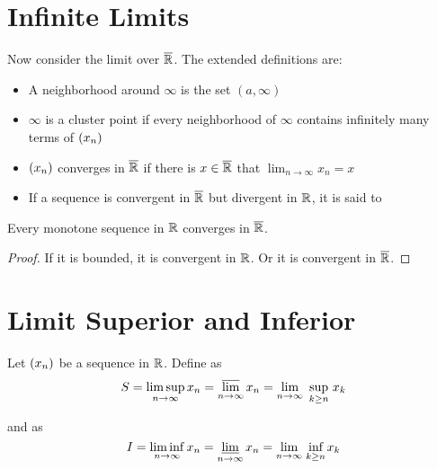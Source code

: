 
\section{Infinite Limits}

Now consider the limit over $\overline{\mathbb{R}}$. The extended definitions are:
\begin{itemize}
    \item A neighborhood around $\infty$ is the set $(a, \infty)$
    \item $\infty$ is a cluster point if every neighborhood of $\infty$ contains infinitely many terms of $\sequence{x_n}$
    \item $\sequence{x_n}$ converges in $\overline{\mathbb{R}}$ if there is $x \in \overline{\mathbb{R}}$ that $\lim_{n \rightarrow \infty} x_n = x$
    \item If a sequence is convergent in $\overline{\mathbb{R}}$ but divergent in $\mathbb{R}$, it is said to 
\end{itemize}

\begin{theorem}
    Every monotone sequence in $\mathbb{R}$ converges in $\overline{\mathbb{R}}$.
\end{theorem}
\begin{proof}
    If it is bounded, it is convergent in $\mathbb{R}$. Or it is convergent in $\overline{\mathbb{R}}$.
\end{proof}





\section{Limit Superior and Inferior}

\begin{definition}
    Let $\sequence{x_n}$ be a sequence in $\mathbb{R}$. Define  as
    \begin{equation}
        S = \limsup_{n \rightarrow \infty} x_n = \varlimsup_{n\rightarrow \infty} x_n = \lim_{n \rightarrow \infty} \underset{k \geq n}{\text{ sup }} x_k
    \end{equation}
    
    and  as
    \begin{equation}
        I = \liminf_{n \rightarrow \infty} x_n = \varliminf_{n\rightarrow \infty} x_n = \lim_{n \rightarrow \infty} \underset{k \geq n}{\text{ inf }} x_k
    \end{equation}    
\end{definition}

